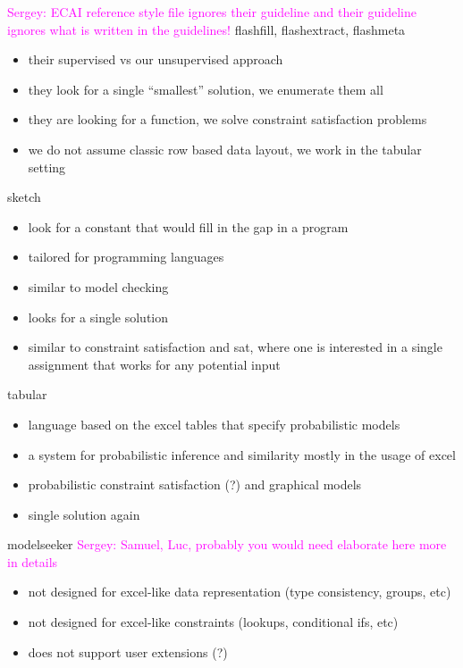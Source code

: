 \documentclass{sig-alternate-05-2015}
\newcommand{\sergey}[1]{\textcolor{magenta}{{\sc Sergey:} #1}\xspace}
\begin{document}
\sergey{ECAI reference style file ignores their guideline and their guideline ignores what is written in the guidelines!}
flashfill, flashextract, flashmeta \cite{flashfill,flashextract,flashmeta}
\begin{itemize}
  \item their supervised vs our unsupervised approach
  \item they look for a single ``smallest'' solution, we enumerate them all
  \item they are looking for a function, we solve constraint satisfaction problems
  \item we do not assume classic row based data layout, we work in the tabular setting
\end{itemize}

sketch \cite{sketch}
\begin{itemize}
  \item look for a constant that would fill in the gap in a program
  \item tailored for programming languages
  \item similar to model checking
  \item looks for a single solution
  \item similar to constraint satisfaction and sat, where one is interested in a single assignment that works for any potential input
\end{itemize}

tabular \cite{tabular}
\begin{itemize}
  \item language based on the excel tables that specify probabilistic models
  \item a system for probabilistic inference and similarity mostly in the usage of excel
  \item probabilistic constraint satisfaction (?) and graphical models
  \item single solution again
\end{itemize}

modelseeker \cite{modelseeker} \sergey{Samuel, Luc, probably you would need elaborate here more in details}

\begin{itemize}
  \item not designed for excel-like data representation (type consistency, groups, etc)
  \item not designed for excel-like constraints (lookups, conditional ifs, etc)
  \item does not support user extensions (?)
\end{itemize}
\end{document}
